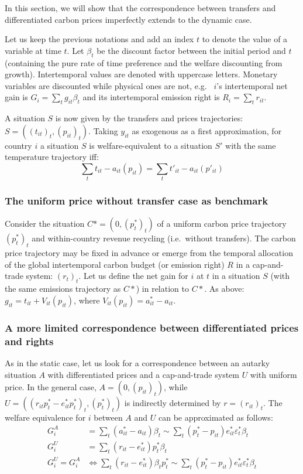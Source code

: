 \documentclass[12pt,english]{article}
\begin{document}
In this section, we will show that the correspondence between transfers
and differentiated carbon prices imperfectly extends to the dynamic
case.

Let us keep the previous notations and add an index $t$ to denote the
value of a variable at time $t$. Let $\beta_t$ be the discount
factor between the initial period and $t$ (containing the pure rate of
time preference and the welfare discounting from growth). Intertemporal
values are denoted with uppercase letters. Monetary variables are
discounted while physical ones are not, e.g.~ $i$'s intertemporal net
gain is $G_i = \sum_t g_{it} \beta_t$ and its intertemporal emission
right is $R_i = \sum_t r_{it}$.

A situation $S$ is now given by the transfers and prices trajectories:
$S=((t_{it})_t, (p_{it})_t)$. Taking $y_{it}$ as exogenous as a
first approximation, for country $i$ a situation $S$ is
welfare-equivalent to a situation $S'$ with the same temperature
trajectory iff:
$$\sum_t t_{it} - a_{it}(p_{it}) = \sum_t t'_{it} - a_{it}(p'_{it})$$

\subsubsection*{The uniform price without transfer case as
benchmark}\label{the-uniform-price-without-transfer-case-as-benchmark}

Consider the situation $C*=(0,(p^*_t)_t)$ of a uniform carbon price
trajectory $(p^*_t)_t$ and within-country revenue recycling
(i.e.~without transfers). The carbon price trajectory may be fixed in
advance or emerge from the temporal allocation of the global
intertemporal carbon budget (or emission right) $R$ in a cap-and-trade
system: $(r_{t})_t$. Let us define the net gain for $i$ at $t$ in
a situation $S$ (with the same emissions trajectory as $C*$) in
relation to $C*$. As above: $g_{it} = t_{it} + V_{it}(p_{it})$,
where $V_{it}(p_{it}) = a^*_{it} - a_{it}$.

\subsubsection*{A more limited correspondence between differentiated
prices and
rights}\label{a-more-limited-correspondence-between-differentiated-prices-and-rights}

As in the static case, let us look for a correspondence between an
autarky situation $A$ with differentiated prices and a cap-and-trade
system $U$ with uniform price. In the general case,
$A=(0, (p_{it})_t)$, while
$U=((r_{it}p^*_t-e^*_{it}p^*_t)_t, (p^*_t)_t)$ is indirectly
determined by $r=(r_{it})_t$. The welfare equivalence for $i$ between $A$ and $U$ can be approximated as follows: 
$$\begin{aligned}
G^A_i &= \sum_t (a^*_{it} - a_{it})\beta_t \sim \sum_t (p^*_t - p_{it}) e^*_{it}  \varepsilon^*_t \beta_t \\
G^U_i &= \sum_t (r_{it} - e^*_{it}) p^*_t \beta_t \\
G^U_i = G^A_i &\Leftrightarrow \sum_t (r_{it} - e^*_{it}) \beta_t p^*_t  \sim \sum_t (p^*_t - p_{it}) e^*_{it}  \varepsilon^*_t \beta_t
\end{aligned}$$
\end{document}
